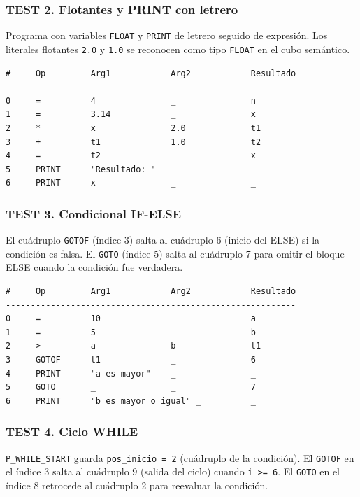 \documentclass[12pt, letterpaper]{article}
\theoremstyle{definition}
\begin{document}
\subsubsection*{TEST 2. Flotantes y PRINT con letrero}

Programa con variables \texttt{FLOAT} y \texttt{PRINT} de letrero seguido de expresión.  Los literales flotantes \texttt{2.0} y \texttt{1.0} se reconocen como tipo \texttt{FLOAT} en el cubo semántico.

\begin{verbatim}
#     Op         Arg1            Arg2            Resultado
----------------------------------------------------------
0     =          4               _               n
1     =          3.14            _               x
2     *          x               2.0             t1
3     +          t1              1.0             t2
4     =          t2              _               x
5     PRINT      "Resultado: "   _               _
6     PRINT      x               _               _
\end{verbatim}

\subsubsection*{TEST 3. Condicional IF-ELSE}

El cuádruplo \texttt{GOTOF} (índice 3) salta al cuádruplo 6 (inicio del ELSE) si la condición es falsa.  El \texttt{GOTO} (índice 5) salta al cuádruplo 7 para omitir el bloque ELSE cuando la condición fue verdadera.

\begin{verbatim}
#     Op         Arg1            Arg2            Resultado
----------------------------------------------------------
0     =          10              _               a
1     =          5               _               b
2     >          a               b               t1
3     GOTOF      t1              _               6
4     PRINT      "a es mayor"    _               _
5     GOTO       _               _               7
6     PRINT      "b es mayor o igual" _          _
\end{verbatim}

\subsubsection*{TEST 4. Ciclo WHILE}

\texttt{P\_WHILE\_START} guarda \texttt{pos\_inicio = 2} (cuádruplo de la condición).  El \texttt{GOTOF} en el índice 3 salta al cuádruplo 9 (salida del ciclo) cuando \texttt{i >= 6}.  El \texttt{GOTO} en el índice 8 retrocede al cuádruplo 2 para reevaluar la condición.
\end{document}

